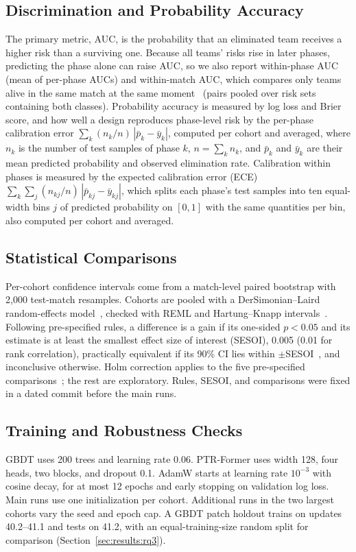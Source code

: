 \documentclass[sigconf,anonymous,nonacm]{acmart}
\begin{document}
\subsection{Discrimination and Probability Accuracy}
The primary metric, AUC, is the probability that an eliminated team receives a higher risk than a surviving one.
Because all teams' risks rise in later phases, predicting the phase alone can raise AUC, so we also report within-phase AUC (mean of per-phase AUCs) and within-match AUC, which compares only teams alive in the same match at the same moment~\cite{HeagertyZheng05} (pairs pooled over risk sets containing both classes).
Probability accuracy is measured by log loss and Brier score, and how well a design reproduces phase-level risk by the per-phase calibration error $\sum_{k}(n_k/n)\,|\bar{p}_k-\bar{y}_k|$, computed per cohort and averaged, where $n_k$ is the number of test samples of phase $k$, $n=\sum_k n_k$, and $\bar{p}_k$ and $\bar{y}_k$ are their mean predicted probability and observed elimination rate. Calibration within phases is measured by the expected calibration error (ECE)~\cite{Naeini15} $\sum_{k}\sum_{j}(n_{kj}/n)\,|\bar{p}_{kj}-\bar{y}_{kj}|$, which splits each phase's test samples into ten equal-width bins $j$ of predicted probability on $[0,1]$ with the same quantities per bin, also computed per cohort and averaged.

\subsection{Statistical Comparisons}
Per-cohort confidence intervals come from a match-level paired bootstrap with 2,000 test-match resamples.
Cohorts are pooled with a DerSimonian--Laird random-effects model~\cite{DerSimonian86}, checked with REML and Hartung--Knapp intervals~\cite{HartungKnapp01}.
Following pre-specified rules, a difference is a gain if its one-sided $p<0.05$ and its estimate is at least the smallest effect size of interest (SESOI), 0.005 (0.01 for rank correlation), practically equivalent if its 90\% CI lies within $\pm$SESOI~\cite{Schuirmann87}, and inconclusive otherwise.
Holm correction applies to the five pre-specified comparisons~\cite{Holm79}; the rest are exploratory. Rules, SESOI, and comparisons were fixed in a dated commit before the main runs.
\subsection{Training and Robustness Checks}
GBDT uses 200 trees and learning rate 0.06. PTR-Former uses width 128, four heads, two blocks, and dropout 0.1. AdamW starts at learning rate $10^{-3}$ with cosine decay, for at most 12 epochs and early stopping on validation log loss. Main runs use one initialization per cohort. Additional runs in the two largest cohorts vary the seed and epoch cap. A GBDT patch holdout trains on updates 40.2--41.1 and tests on 41.2, with an equal-training-size random split for comparison (Section~\ref{sec:results:rq3}).
\end{document}
